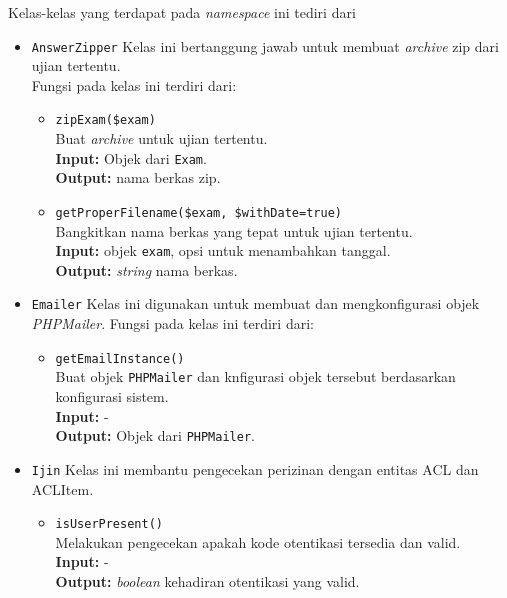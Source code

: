     Kelas-kelas yang terdapat pada \textit{namespace} ini tediri dari
    \begin{itemize}
        \item \texttt{AnswerZipper}
            Kelas ini bertanggung jawab untuk membuat \textit{archive} zip dari ujian tertentu.\\
            Fungsi pada kelas ini terdiri dari:
            \begin{itemize}
                \item \texttt{zipExam(\$exam)} \\
                    Buat \textit{archive} untuk ujian tertentu. \\
                    \textbf{Input:} Objek dari \texttt{Exam}.\\
                    \textbf{Output:} nama berkas zip.
                    
                \item \texttt{getProperFilename(\$exam, \$withDate=true)} \\
                    Bangkitkan nama berkas yang tepat untuk ujian tertentu.\\
                    \textbf{Input:} objek \texttt{exam}, opsi untuk menambahkan tanggal.\\
                    \textbf{Output:} \textit{string} nama berkas.
            \end{itemize}
        
        \item \texttt{Emailer}
            Kelas ini digunakan untuk membuat dan mengkonfigurasi objek \textit{PHPMailer}.
            Fungsi pada kelas ini terdiri dari:
            \begin{itemize}
                \item \texttt{getEmailInstance()} \\
                    Buat objek \texttt{PHPMailer} dan knfigurasi objek tersebut berdasarkan
                    konfigurasi sistem.\\
                    \textbf{Input:} -\\
                    \textbf{Output:} Objek dari \texttt{PHPMailer}.
            \end{itemize}
            
        \item \texttt{Ijin}
            Kelas ini membantu pengecekan perizinan dengan entitas ACL dan ACLItem.
            \begin{itemize}
                \item \texttt{isUserPresent()} \\
                    Melakukan pengecekan apakah kode otentikasi tersedia dan valid. \\
                    \textbf{Input:} -\\
                    \textbf{Output:} \textit{boolean} kehadiran otentikasi yang valid.
                    

\end{itemize}
\end{itemize}
